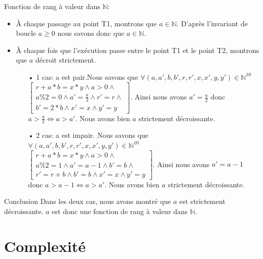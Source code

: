 \documentclass[12pt,a4paper]{report}
\begin{document}
\begin{flushleft}
Fonction de rang à valeur dans $\mathbb{N}$:
\begin{itemize}
\item \`A chaque passage au point T1, montrons que $a \in \mathbb{N}$. D'après l'invariant de boucle $a \ge 0$ nous savons donc que $a \in \mathbb{N}$.
\item \`A chaque fois que l'exécution passe entre le point T1 et le point T2, montrons que $a$ décroit strictement.
\begin{itemize}
\item[•] 1 cas: a est pair.Nous savons que $\forall(a,a',b,b',r,r',x,x',y,y')\in \mathbb{N}^{10}$ $\left[ \begin{array}{c} r + a*b = x*y\wedge a>0\wedge \\
a\%2=0\wedge a'= \frac{a}{2} \wedge r'=r \wedge\\
b'=2*b\wedge x'=x \wedge y'=y\end{array}
\right]$. Ainsi nous avons $a'=\frac{a}{2}$ donc $a>\frac{a}{2} \Leftrightarrow a>a'$. Nous avons bien $a$ strictement décroissante.
\item[•] 2 cas: a est impair. Nous savons que $\forall(a,a',b,b',r,r',x,x',y,y')\in \mathbb{N}^{10}$ $\left[ \begin{array}{c} r + a*b = x*y\wedge a>0\wedge \\
a\%2=1\wedge a'= a-1\wedge b'=b \wedge\\
r'=r+b\wedge b'=b\wedge x'=x \wedge y'=y\end{array}
\right]$. Ainsi nous avons $a'=a-1$ donc $a>a-1 \Leftrightarrow a>a'$. Nous avons bien $a$ strictement décroissante.
\end{itemize}
\end{itemize}
\begin{Cas1}{Conclusion}
 Dans les deux cas, nous avons montré que $a$ est strictement décroissante. $a$ est donc une fonction de rang à valeur dans $\mathbb{N}$.
\end{Cas1}
\end{flushleft}

\section*{Complexité}
\end{document}
